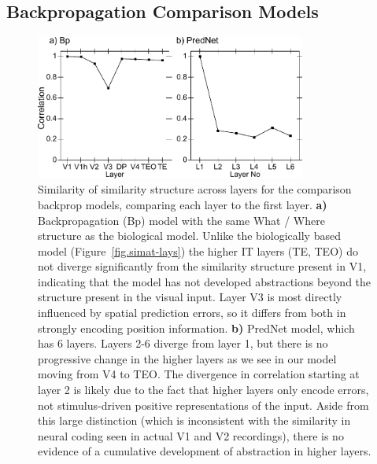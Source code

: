 \documentclass[11pt,twoside]{article}
\newif\myifpdf
\begin{document}
\subsection{Backpropagation Comparison Models}

\begin{figure}
  \centering\includegraphics[width=3.5in]{fig_deepleabra_wwi_bp_prednet_v1sim}
  \caption{\footnotesize Similarity of similarity structure across layers for the comparison backprop models, comparing each layer to the first layer.  {\bf a)} Backpropagation (Bp) model with the same What / Where structure as the biological model.  Unlike the biologically based model (Figure~\ref{fig.simat-lays}) the higher IT layers (TE, TEO) do not diverge significantly from the similarity structure present in V1, indicating that the model has not developed abstractions beyond the structure present in the visual input.  Layer V3 is most directly influenced by spatial prediction errors, so it differs from both in strongly encoding position information.  {\bf b)} PredNet model, which has 6 layers.  Layers 2-6 diverge from layer 1, but there is no progressive change in the higher layers as we see in our model moving from V4 to TEO. The divergence in correlation starting at layer 2 is likely due to the fact that higher layers only encode errors, not stimulus-driven positive representations of the input.  Aside from this large distinction (which is inconsistent with the similarity in neural coding seen in actual V1 and V2 recordings), there is no evidence of a cumulative development of abstraction in higher layers.}
  \label{fig.bpred-v1sim}
\end{figure}
\end{document}
